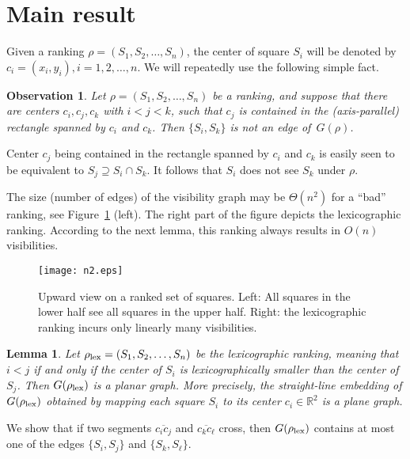 \documentclass[fleqn,11pt]{article}
\newtheorem{lemma}[definition]{Lemma}
\newtheorem{observation}[definition]{Observation}
\newcommand{\proof}{\noindent{\bf Proof.} \hspace{1mm}}
\newcommand{\qed}{\hfill\usebox{\proofsymbol}}
\newcommand{\R}{\mathds{R}}
\newcommand{\lex}{\rm lex}
\begin{document}
\section{Main result}
Given a ranking $\rho=(S_1,S_2,\ldots,S_n)$, the center of square
$S_i$ will be denoted by $c_i=(x_i,y_i), i=1,2,\ldots,n$.  We will
repeatedly use the following simple fact.

\begin{observation}\label{obs:help}
  Let $\rho=(S_1,S_2,\ldots,S_n)$ be a ranking, and suppose that
  there are centers $c_i,c_j,c_k$ with $i<j<k$, such that $c_j$ is
  contained in the (axis-parallel) rectangle spanned by $c_i$ and
  $c_k$. Then $\{S_i,S_k\}$ is not an edge of~$G(\rho)$.
\end{observation}

\proof 
Center $c_j$ being contained in the rectangle spanned by $c_i$
and $c_k$ is easily seen to be equivalent to $S_j\supseteq S_i\cap S_k$.
It follows that $S_i$ does not see $S_k$ under $\rho$.  
\qed

The size (number of edges) of the visibility graph may be
$\Theta(n^2)$ for a ``bad'' ranking, see Figure~\ref{fig:n2} (left).
The right part of the figure depicts the lexicographic ranking.
According to the next lemma, this ranking always results in $O(n)$
visibilities.

\begin{figure}[htb]
\begin{center}
\texttt{[image: n2.eps]}
\end{center}
\caption{Upward view on a ranked set of squares. Left: All squares in the 
lower half see all squares in the
upper half. Right: the lexicographic ranking incurs only linearly many 
visibilities.\label{fig:n2}}
\end{figure}

\begin{lemma}\label{lem:main}
  Let $\rho_{\lex}=(S_1,S_2,\ldots,S_n)$ be the lexicographic ranking,
  meaning that $i<j$ if and only if the center of $S_i$ is
  lexicographically smaller than the center of $S_j$. Then $G(\rho_{\lex})$
  is a planar graph. More precisely, the straight-line embedding of
  $G(\rho_{\lex})$ obtained by mapping each square $S_i$ to its center
  $c_i\in\R^2$ is a plane graph.
\end{lemma}

\proof We show that if two segments $\overline{c_ic_j}$ and
$\overline{c_kc_{\ell}}$ cross, then $G(\rho_{\lex})$ contains at most
one of the edges $\{S_i,S_j\}$ and $\{S_k,S_{\ell}\}$. 
\end{document}
